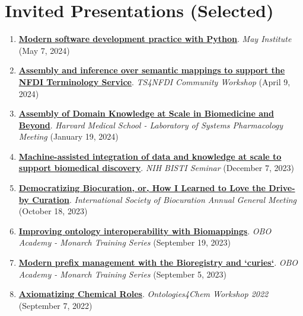 \documentclass[10pt,a4paper,sans]{moderncv} %
\begin{document}
\section{Invited Presentations (Selected)}\label{sec:presentations}
\begin{enumerate}
\itemsep0.5em
    \item \textbf{\href{https://docs.google.com/document/d/1vP7ZA29J0PEI3CsMm4iGPq4DQG1sEgBvqoucfPga8JI/edit?usp=sharing}{Modern software development practice with Python}}. \textit{May Institute} (May 7, 2024)

    \item \textbf{\href{https://bit.ly/semra4nfdi}{Assembly and inference over semantic mappings to support the NFDI Terminology Service}}. \textit{TS4NFDI Community Workshop} (April 9, 2024)

    \item \textbf{\href{https://bit.ly/cth-lsp-2024}{Assembly of Domain Knowledge at Scale in Biomedicine and Beyond}}. \textit{Harvard Medical School - Laboratory of Systems Pharmacology Meeting} (January 19, 2024)

    \item \textbf{\href{https://www.dropbox.com/scl/fi/phd98s1oql2knjp2v9lhq/2023-12-07_hoyt_gyori_nih_bisti.pdf?rlkey=qlorv5a1d79ofhhkatjpmj3tb&dl=0}{Machine-assisted integration of data and knowledge at scale to support biomedical discovery}}. \textit{NIH BISTI Seminar} (December 7, 2023)

    \item \textbf{\href{https://docs.google.com/presentation/d/1D6P-1hQefXU_yRODSJkOFLH3tPxsk9Abi20ycA0xKWU/edit?usp=sharing}{Democratizing Biocuration, or, How I Learned to Love the Drive-by Curation}}. \textit{International Society of Biocuration Annual General Meeting} (October 18, 2023)

    \item \textbf{\href{https://bit.ly/obo-academy-biomappings}{Improving ontology interoperability with Biomappings}}. \textit{OBO Academy - Monarch Training Series} (September 19, 2023)

    \item \textbf{\href{https://docs.google.com/presentation/d/1Hyi9t_wwoMAFskWtDBMHGpAw7ZwTQx-3RKrFdTFYB88/edit?usp=sharing}{Modern prefix management with the Bioregistry and `curies`}}. \textit{OBO Academy - Monarch Training Series} (September 5, 2023)

    \item \textbf{\href{https://bit.ly/ontologies4chem-crog}{Axiomatizing Chemical Roles}}. \textit{Ontologies4Chem Workshop 2022} (September 7, 2022)


\end{enumerate}
\end{document}
